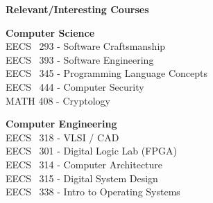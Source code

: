 \documentclass[letterpaper,11pt]{article}
\newcommand{\resheading}[1]{{\large \colorbox{shadingcolor}{\begin{minipage}{\textwidth}{\textbf{#1 \vphantom{p\^{E}}}}\end{minipage}}}}
\begin{document}
%
%
\resheading{Relevant/Interesting Courses}

\vspace{0.1in}
\begin{minipage}{\linewidth}
\vfill\noindent
\begin{minipage}[b]{0.5\textwidth}
	\raggedright
	\textbf{Computer Science} \\
	EECS \ 293 - Software Craftsmanship \\
	EECS \ 393 - Software Engineering \\
	EECS \ 345 - Programming Language Concepts \\
	EECS \ 444 - Computer Security \\
	MATH 408 - Cryptology \\
\end{minipage}
\begin{minipage}[b]{0.5\textwidth}
	\raggedright
	\textbf{Computer Engineering} \\
	EECS \ 318 - VLSI / CAD \\
	EECS \ 301 - Digital Logic Lab (FPGA) \\
	EECS \ 314 - Computer Architecture \\
	EECS \ 315 - Digital System Design \\
	EECS \ 338 - Intro to Operating Systems \\
\end{minipage}

\end{minipage}
\end{document}

